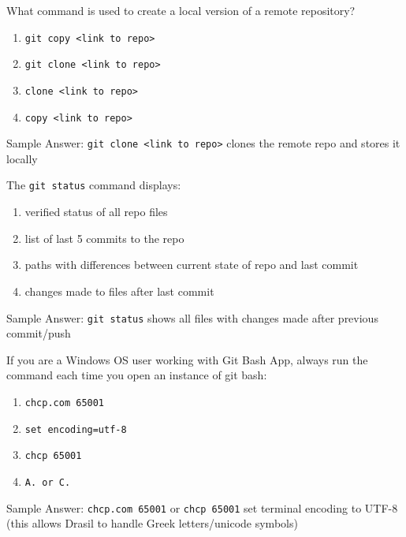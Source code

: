 \documentclass[12pt,fleqn]{examtst}
\begin{document}

\renewcommand{\labelenumi}{\Alph{enumi}.}


\noindent
\begin{minipage}{\textwidth}

What command is used to create a local version of a remote repository?

\begin{enumerate}
    \item \lstinline{git copy <link to repo>}
    \item \lstinline{git clone <link to repo>} \marker
    \item \lstinline{clone <link to repo>}
    \item \lstinline{copy <link to repo>}
\end{enumerate}
Sample Answer: \lstinline{git clone <link to repo>} clones the remote repo and stores it locally

The \lstinline{git status} command displays:

\begin{enumerate}
    \item verified status of all repo files
    \item list of last 5 commits to the repo
    \item paths with differences between current state of repo and last commit \marker
    \item changes made to files after last commit
\end{enumerate}
Sample Answer: \lstinline{git status} shows all files with changes made after previous commit/push

If you are a Windows OS user working with Git Bash App, always run the command each time you open an instance of git bash:

\begin{enumerate}
    \item \lstinline{chcp.com 65001} 
    \item \lstinline{set encoding=utf-8}
    \item \lstinline{chcp 65001}
    \item \lstinline{A. or C.} \marker
\end{enumerate}
Sample Answer: \lstinline{chcp.com 65001} or \lstinline{chcp 65001} set terminal encoding to UTF-8 (this allows Drasil to handle Greek letters/unicode symbols)

\end{minipage}
\end{document}
